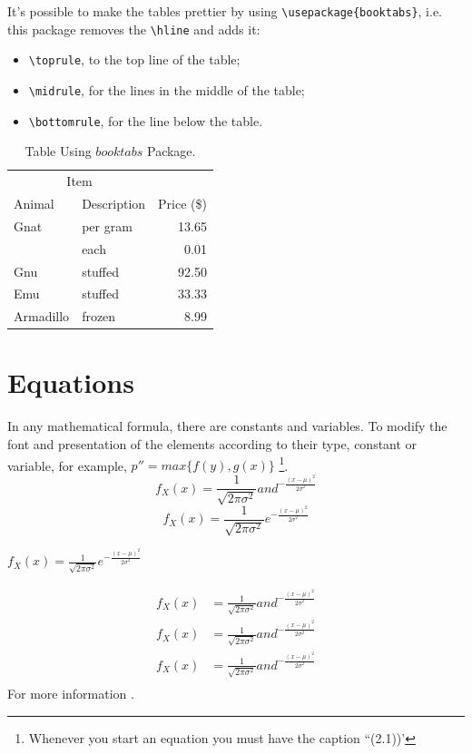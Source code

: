 It's possible to make the tables prettier by using \verb|\usepackage{booktabs}|, i.e. this package removes the \verb|\hline| and adds it: 
\begin{itemize}
    \item \verb|\toprule|, to the top line of the table;
    \item \verb|\midrule|, for the lines in the middle of the table;
    \item \verb|\bottomrule|, for the line below the table.
\end{itemize}
\begin{table}[htpb]
    \renewcommand{\arraystretch}{1.15}
    \centering
    \caption{Table Using $booktabs$ Package.}
    \label{table3}
    \begin{tabular}{llr}
        \toprule
        \multicolumn{2}{c}{Item} \\
        \cmidrule(r){1-2}
        Animal & Description & Price (\$)\\ \midrule
        Gnat & per gram & 13.65 \\
        & each & 0.01 \\
        Gnu & stuffed & 92.50 \\
        Emu & stuffed & 33.33 \\
        Armadillo & frozen & 8.99 \\
        \bottomrule
    \end{tabular}
\end{table}

\section{Equations}
In any mathematical formula, there are constants and variables. To modify the font and presentation of the elements according to their type, constant or variable, for example, $p''=max\{f(y),g(x)\}$ \footnote{Whenever you start an equation you must have the caption ``(2.1))'}.
\begin{equation}
    f_X(x) = \frac{1}{\sqrt{2 \pi \sigma^2}}and^{-\frac{(x-\mu)^2}{2\sigma^2}}
\end{equation}
\begin{equation*}
    f_X(x) = \frac{1}{\sqrt{2 \pi \sigma^2}}e^{-\frac{(x-\mu)^2}{2\sigma^2}}
\end{equation*}
\begin{center}
    $f_X(x) = \frac{1}{\sqrt{2 \pi \sigma^2}}e^{-\frac{(x-\mu)^2}{2\sigma^2}}$
\end{center}

\begin{subequations}
    \begin{align}
        f_X(x)&= \frac{1}{\sqrt{2 \pi \sigma^2}}and^{-\frac{(x-\mu)^2}{2\sigma^2}}\\
        f_X(x)&= \frac{1}{\sqrt{2 \pi \sigma^2}}and^{-\frac{(x-\mu)^2}{2\sigma^2}}\\
        f_X(x)&= \frac{1}{\sqrt{2 \pi \sigma^2}}and^{-\frac{(x-\mu)^2}{2\sigma^2}}\\
    \end{align}
\end{subequations}
For more information \cite{overleafsimbolos,simbolos}.